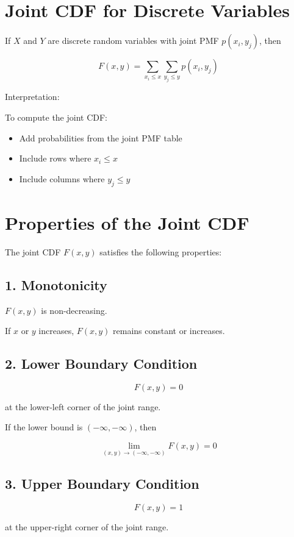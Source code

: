 \documentclass{article}
\begin{document}
\section{Joint CDF for Discrete Variables}

If $X$ and $Y$ are discrete random variables with joint PMF $p(x_i,y_j)$, then

\[
F(x,y)=\sum_{x_i\le x}\sum_{y_j\le y}p(x_i,y_j)
\]

Interpretation:

To compute the joint CDF:

\begin{itemize}
\item Add probabilities from the joint PMF table
\item Include rows where $x_i\le x$
\item Include columns where $y_j\le y$
\end{itemize}

\section{Properties of the Joint CDF}

The joint CDF $F(x,y)$ satisfies the following properties:

\subsection*{1. Monotonicity}

$F(x,y)$ is non-decreasing.

If $x$ or $y$ increases, $F(x,y)$ remains constant or increases.

\subsection*{2. Lower Boundary Condition}

\[
F(x,y)=0
\]

at the lower-left corner of the joint range.

If the lower bound is $(-\infty,-\infty)$, then

\[
\lim_{(x,y)\to(-\infty,-\infty)}F(x,y)=0
\]

\subsection*{3. Upper Boundary Condition}

\[
F(x,y)=1
\]

at the upper-right corner of the joint range.
\end{document}
